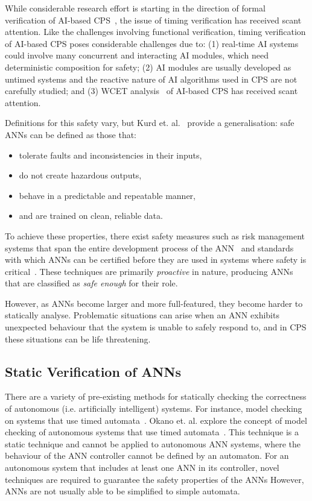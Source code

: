 While considerable research effort is starting in the direction of formal verification of \ac{AI}-based \ac{CPS}~\cite{seshia2016towards, russell2015}, the issue of timing verification has received scant attention. 
Like the challenges involving functional verification, timing verification of AI-based  \ac{CPS} poses considerable challenges due to: (1) real-time \ac{AI} systems could involve many concurrent and interacting \ac{AI} modules, which need deterministic composition for safety; (2) \ac{AI} modules are usually developed as untimed systems and the reactive nature of AI algorithms used in CPS are not carefully studied; and (3) \acf{WCET} analysis~\cite{wilhelm2008worst} of \ac{AI}-based \ac{CPS} has received scant attention.

Definitions for this safety vary, but Kurd et. al.~\cite{EstSafeCriteria2003} provide a generalisation: safe \acp{ANN} can be defined as those that:
\begin{itemize}
	\item tolerate faults and inconsistencies in their inputs,
	\item do not create hazardous outputs,
	\item behave in a predictable and repeatable manner,
	\item and are trained on clean, reliable data. 
\end{itemize}

To achieve these properties, there exist safety measures such as risk management systems that span the entire development process of the \ac{ANN}~\cite{ANNDevModel1999} and standards with which \acp{ANN} can be certified before they are used in systems where safety is critical~\cite{SCANNStandard}. 
These techniques are primarily \textit{proactive} in nature, producing \acp{ANN} that are classified as \textit{safe enough} for their role. 

However, as \acp{ANN} become larger and more full-featured, they  become harder to statically analyse.
Problematic situations can arise when an \ac{ANN} exhibits unexpected behaviour that the system is unable to safely respond to, and in \ac{CPS} these situations can be life threatening.

\subsection{Static Verification of \acp{ANN}}
There are a variety of pre-existing methods for statically checking the correctness of autonomous (i.e. artificially intelligent) systems.
For instance, model checking on systems that use timed automata~\cite{timed-enf-autonomous}.
Okano et. al. explore the concept of model checking of autonomous systems that use timed automata~\cite{timed-enf-autonomous}. 
This technique is a static technique and cannot be applied to autonomous \ac{ANN} systems, where the behaviour of the \ac{ANN} controller cannot be defined by an automaton.
For an autonomous system that includes at least one \ac{ANN} in its controller, novel techniques are required to guarantee the safety properties of the \acp{ANN}
However, \acp{ANN} are not usually able to be simplified to simple automata.


